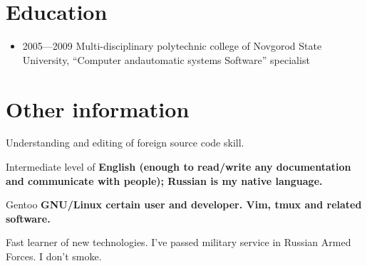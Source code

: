 \begin{flushright}
\section{Education}
\begin{itemize}
\item 2005---2009 Multi-disciplinary polytechnic college of
Novgorod State University,
``Computer and\linebreak automatic systems Software'' specialist
\end{itemize}

\section{Other information}
Understanding and editing of foreign source code skill.

Intermediate level of \bfseries English \mdseries
(enough to read/write any documentation and communicate with people);
Russian is my native language.

Gentoo \bfseries GNU/Linux \mdseries certain user and developer.
Vim, tmux and related software.

Fast learner of new technologies.
I've passed military service in Russian Armed Forces.
I don't smoke.

\end{flushright}
